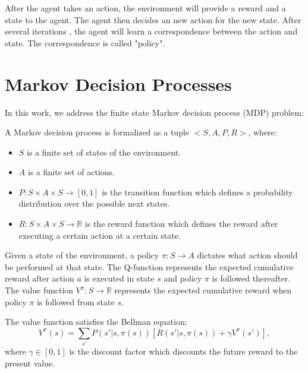 After the agent takes an action, the environment will provide a reward and a state to the
agent. The agent then decides an new action for the new state. After several iterations
, the agent will learn a correspondence between the action and state. The correspondence is called 
"policy". 

\section{Markov Decision Processes}

In this work, we address the finite state Markov decision process (MDP) problem:
\begin{definition} A Markov decision process is formalized as a tuple $<S, A, P, R>$, where:
\begin{itemize}
    \item $S$ is a finite set of states of the environment.
    \item $A$ is a finite set of actions.
    \item $P:S \times A \times S \rightarrow [0, 1]$ is the transition function which defines a probability distribution over the possible next states.
    \item $R:S \times A \times S \rightarrow \mathbb{R}$ is the reward function which defines the reward after executing a certain action at a certain state.
 \end{itemize}
\end{definition}

Given a state of the environment, a policy $\pi: S \rightarrow A$ dictates what action should be performed at that state. 
The Q-function represents the expected cumulative reward after action $a$ is executed in state $s$ and 
policy $\pi$ is followed thereafter.
The value function $V^{\pi}: S \rightarrow \mathbb{R}$ represents the expected cumulative reward when 
policy $\pi$ is followed from state $s$.

The value function satisfies the Bellman equation:
\begin{equation}
    V^{\pi}(s) = \sum_{s'}P(s'|s, \pi(s))[R(s'|s, \pi(s)) + \gamma V^{\pi}(s')],
    \label{eq:V}
\end{equation}
where $\gamma \in [0, 1]$ is the discount factor which discounts the future reward to the present value.

